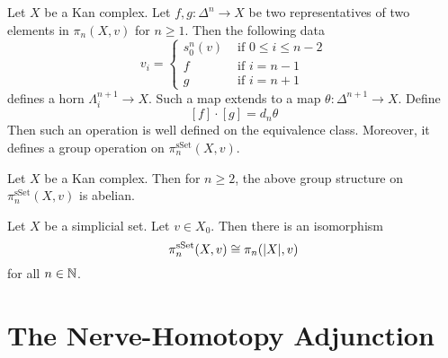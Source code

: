 \documentclass[a4paper]{article}
\begin{document}
\begin{thm}{}{} Let $X$ be a Kan complex. Let $f,g:\Delta^n\to X$ be two representatives of two elements in $\pi_n(X,v)$ for $n\geq 1$. Then the following data $$v_i=\begin{cases}
s_0^n(v) & \text{ if } 0\leq i\leq n-2\\
f & \text{ if } i=n-1\\
g & \text{ if } i=n+1
\end{cases}$$
defines a horn $\Lambda_i^{n+1}\to X$. Such a map extends to a map $\theta:\Delta^{n+1}\to X$. Define $$[f]\cdot[g]=d_n\theta$$ Then such an operation is well defined on the equivalence class. Moreover, it defines a group operation on $\pi_n^\text{sSet}(X,v)$. 
\end{thm}

\begin{thm}{}{} Let $X$ be a Kan complex. Then for $n\geq 2$, the above group structure on $\pi_n^\text{sSet}(X,v)$ is abelian. 
\end{thm}

\begin{thm}{}{} Let $X$ be a simplicial set. Let $v\in X_0$. Then there is an isomorphism $$\pi_n^\text{sSet}(X,v)\cong\pi_n(\abs{X},v)$$ for all $n\in\mathbb{N}$. 
\end{thm}

\pagebreak
\section{The Nerve-Homotopy Adjunction}
\end{document}
